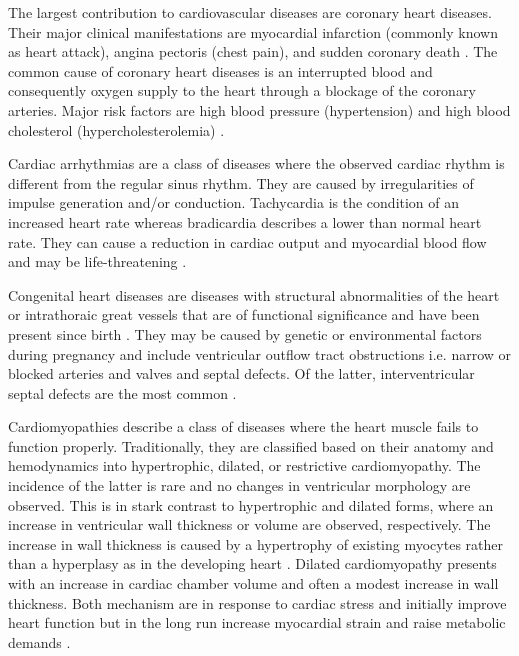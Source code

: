 The largest contribution to cardiovascular diseases are coronary heart diseases. Their major clinical manifestations are myocardial infarction (commonly known as heart attack), angina pectoris (chest pain), and sudden coronary death \citep{Wong2014}. The common cause of coronary heart diseases is an interrupted blood and consequently oxygen supply to the heart through a blockage of the coronary arteries. Major risk factors are high blood pressure (hypertension) and high blood cholesterol (hypercholesterolemia) \citep{Mackay2004}.

Cardiac arrhythmias are a class of diseases where the observed cardiac rhythm is different from the regular sinus rhythm. They are caused by irregularities of impulse generation and/or conduction. Tachycardia is the condition of an increased heart rate whereas bradicardia describes a lower than normal heart rate. They can cause a reduction in cardiac output and myocardial blood flow and may be life-threatening \citep{Durham2002}.

Congenital heart diseases are diseases with structural abnormalities of the heart or intrathoraic great vessels that are of functional significance and have been present since birth \citep{Mitchell1971}. They may be caused by genetic or environmental factors during pregnancy and include ventricular outflow tract  obstructions i.e. narrow or blocked arteries and valves and septal defects. Of the latter, interventricular septal defects are the most common \citep{Hoffman2005}.

Cardiomyopathies describe a class of diseases where the heart muscle fails to function properly. Traditionally, they are classified based on their anatomy and hemodynamics into hypertrophic, dilated, or restrictive cardiomyopathy. The incidence of the latter is rare and no changes in ventricular morphology are observed. This is in stark contrast to hypertrophic and dilated forms, where an increase in ventricular wall thickness or volume are observed, respectively. The increase in wall thickness is caused by a hypertrophy of existing myocytes rather than a hyperplasy as in the developing heart \citep{Lorell2000}. Dilated cardiomyopathy presents with an increase in cardiac chamber volume and often a modest increase in wall thickness. Both mechanism are in response to cardiac stress and initially improve heart function but in the long run increase myocardial strain and raise metabolic demands \citep{Seidman2001}.

